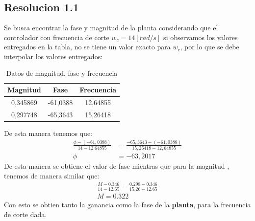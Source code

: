 \documentclass[
  11pt,
  letterpaper,
   addpoints,
   answers
  ]{exam}
\begin{document}
\begin{questions}
\begin{solution}
    \subsection*{Resolucion 1.1}
    Se busca encontrar la fase y magnitud de la planta considerando que el controlador con frecuencia de corte $w_{c} = 14 [rad/s]$ si observamos los valores entregados en la tabla, no se tiene un valor exacto para $w_{c}$, por lo que se debe interpolar los valores entregados:
    \begin{table}[H]
        \centering
        \footnotesize
        \begin{tabular}{|c|c|c|}
        \hline
        \textbf{Magnitud} & \textbf{Fase} & \textbf{Frecuencia} \\
        \hline
        0,345869 & -61,0388 & 12,64855 \\
        0,297748 & -65,3643 & 15,26418 \\
        \hline
        \end{tabular}
        \caption{Datos de magnitud, fase y frecuencia}
    \end{table}
    De esta manera tenemos que:
    \begin{align}
        \frac{\phi - (-61,0388)}{14-12.64855} &= \frac{-65,3643 - (-61,0388)}{15,26418 - 12,64855} \nonumber \\
        \phi &= -63,2017 \nonumber
    \end{align}
    De esta manera se obtiene el valor de fase mientras que para la magnitud , tenemos de manera similar que:
    \begin{align}
        \frac{M - 0.346}{ 14 - 12.65} = \frac{0.298 - 0.346}{15.26 - 12.65} \nonumber \\
        M = 0.322 \nonumber
    \end{align}
    Con esto se obtien tanto la ganancia como la fase de la \textbf{planta}, para la frecuencia de corte dada.

\end{solution}
\end{questions}
\end{document}
